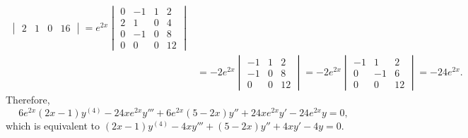 \documentclass[openany]{book}
\newenvironment{sectionSolutions}{
 \begin{enumerate}[item-label={\thesection.\arabic{enumi}.}]
}{
 \end{enumerate}
}
\begin{document}
\begin{sectionSolutions}
\begin{alist}
\begin{align*}
\begin{vmatrix}
2&1&0&16
\end{vmatrix}
=e^{2x}\begin{vmatrix}
0&-1&1&2\\
2&1&0&4\\
0&-1&0&8\\
0&0&0&12
\end{vmatrix}\\
&=-2e^{2x}\begin{vmatrix}
-1&1&2\\
-1&0&8\\
0&0&12
\end{vmatrix}
=-2e^{2x}\begin{vmatrix}
-1&1&2\\
0&-1&6\\
0&0&12
\end{vmatrix}=-24e^{2x}.
\end{align*}
Therefore,
\[
6e^{2x}(2x-1)y^{(4)}-24xe^{2x}y'''
+6e^{2x}(5-2x)y''+24xe^{2x}y'-24e^{2x}y=0,
\]
which is equivalent to
 $(2x-1)y^{(4)}-4xy'''+(5-2x)y''+4xy'-4y=0$.


\end{alist}
\end{sectionSolutions}
\end{document}
